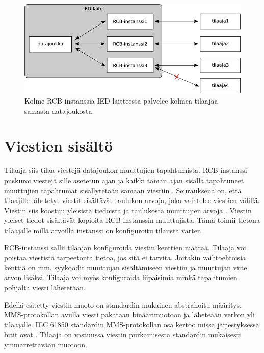 \begin{figure}[ht!]
	\includegraphics[width=1\textwidth]{pictures/rcbs-to-one-dataset.png}
	\caption{Kolme RCB-instanssia IED-laitteessa palvelee kolmea tilaajaa samasta datajoukosta.}
	\label{fig:rcb-to-one-dataset}
\end{figure}


\section{Viestien sisältö}
Tilaaja siis tilaa viestejä datajoukon muuttujien tapahtumista. RCB-instanssi puskuroi viestejä sille asetetun ajan ja kaikki tämän ajan sisällä tapahtuneet muuttujien tapahtumat sisällytetään samaan viestiin \cite[s.~98]{IEC61850-7-2}. Seurauksena on, että tilaajille lähetetyt viestit sisältävät taulukon arvoja, joka vaihtelee viestien välillä. Viestin siis koostuu yleisistä tiedoista ja taulukosta muuttujien arvoja \cite[s.~104]{IEC61850-7-2}. Viestin yleiset tiedot sisältävät kopioita RCB-instanssin muuttujista. Tämä toimii tietona tilaajalle millä arvoilla instanssi on konfiguroitu tilausta varten.

RCB-instanssi sallii tilaajan konfiguroida viestin kenttien määrää. Tilaaja voi poistaa viestistä tarpeetonta tietoa, jos sitä ei tarvita. Joitakin vaihtoehtoisia kenttiä on mm. syykoodit muuttujan sisältämiseen viestiin ja muuttujan viite arvon lisäksi. Tilaaja voi myös konfiguroida liipaisimia minkä tapahtumien pohjalta viesti lähetetään. \mbox{\cite[s.~90]{IEC61850-7-1}} \mbox{\cite[s.~98]{IEC61850-7-2}}

Edellä esitetty viestin muoto on standardin mukainen abstrahoitu määritys. MMS-protokollan avulla viesti pakataan binäärimuotoon ja läheteään verkon yli tilaajalle. IEC 61850 standardin MMS-protokollan osa kertoo missä järjestyksessä bitit ovat \cite{IEC61850-8-1}. Tilaaja on vastuussa viestin purkamisesta standardin mukaisesti ymmärrettävään muotoon.


